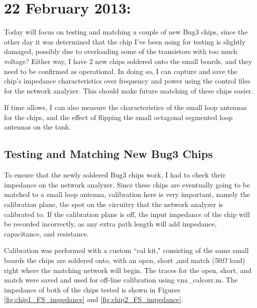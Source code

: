 \documentclass[12pt,onecolumn,titlepage]{article}
\begin{document}
\section{22 February 2013:}

\indent \indent Today will focus on testing and matching a couple of new Bug3 chips, since the other day it was determined that the chip I've been using for testing is slightly damaged, possibly due to overloading some of the transistors with too much voltage? Either way, I have 2 new chips soldered onto the small boards, and they need to be confirmed as operational. In doing so, I can capture and save the chip's impedance characteristics over frequency and power using the control files for the network analyzer. This should make future matching of these chips easier.

If time allows, I can also measure the characteristics of the small loop antennas for the chips, and the effect of flipping the small octagonal segmented loop antennas on the tank.

\subsection{Testing and Matching New Bug3 Chips}
\indent \indent To ensure that the newly soldered Bug3 chips work, I had to check their impedance on the network analyzer. Since these chips are eventually going to be matched to a small loop antenna, calibration here is very important, namely the calibration plane, the spot on the circuitry that the network analyzer is calibrated to. If the calibration plane is off, the input impedance of the chip will be recorded incorrectly, as any extra path length will add impedance, capacitance, and resistance. 

Calibration was performed with a custom ``cal kit," consisting of the same small boards the chips are soldered onto, with an open, short ,and match ($50 \Omega$ load) right where the matching network will begin. The traces for the open, short, and match were saved and used for off-line calibration using vna\_calcorr.m. The impedance of both of the chips tested is shown in Figures \ref{fig:chip1_FS_impedance} and \ref{fig:chip2_FS_impedance}.
\end{document}
